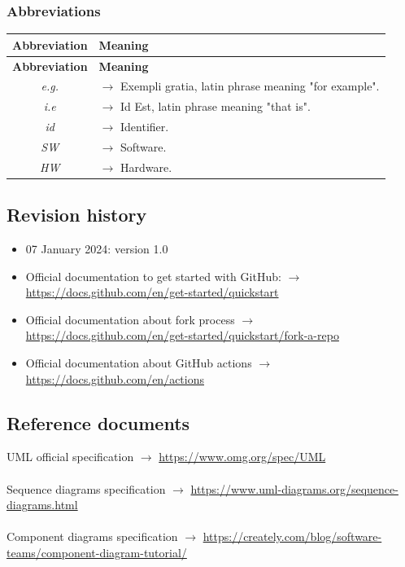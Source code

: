 \documentclass{article}
\begin{document}
{\begin{xltabular}{\textwidth}{ >{\raggedright\arraybackslash}c >{\raggedright\arraybackslash}X }
\end{xltabular}

\newpage
\subsubsection{Abbreviations}
\begin{xltabular}{\textwidth}{ >{\raggedright\arraybackslash}c >{\raggedright\arraybackslash}X }
    \hline
    \textbf{Abbreviation} & \textbf{Meaning} \\
    \hline

    \endfirsthead

    \hline
    \textbf{Abbreviation} & \textbf{Meaning} \\
    \hline

    \endhead
    \endfoot
    \endlastfoot

    \textit{e.g.} & $\rightarrow$ Exempli gratia, latin phrase meaning "for example".
    \\
    \textit{i.e} & $\rightarrow$ Id Est, latin phrase meaning "that is".
    \\
    \textit{id} & $\rightarrow$ Identifier.
    \\
    \textit{SW} & $\rightarrow$ Software.
    \\
    \textit{HW} & $\rightarrow$ Hardware.
    \\
\end{xltabular}
\subsection{Revision history}
\begin{itemize}
    \item 07 January 2024: version 1.0
\end{itemize}
\begin{itemize}
    \item Official documentation to get started with GitHub: $\rightarrow$ \url{https://docs.github.com/en/get-started/quickstart}
    \item Official documentation about fork process $\rightarrow$ \url{https://docs.github.com/en/get-started/quickstart/fork-a-repo}
    \item Official documentation about GitHub actions $\rightarrow$ \url{https://docs.github.com/en/actions}
\end{itemize}
\subsection{Reference documents}
UML official specification $\rightarrow$ \url{https://www.omg.org/spec/UML}
\\ \\
Sequence diagrams specification $\rightarrow$ \url{https://www.uml-diagrams.org/sequence-diagrams.html}
\\ \\
Component diagrams specification $\rightarrow$ \url{https://creately.com/blog/software-teams/component-diagram-tutorial/}

}
\end{document}
